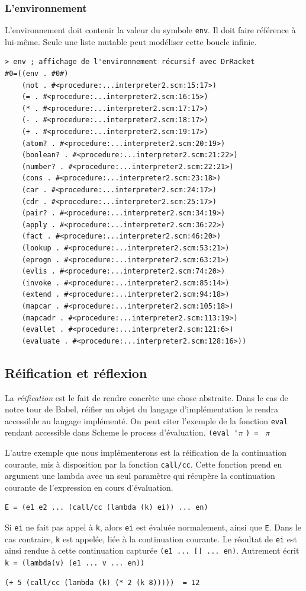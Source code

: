 \documentclass[11pt]{book}
\begin{document}
\subsubsection{L'environnement}
L'environnement doit contenir la valeur du symbole \verb+env+. Il doit faire référence à lui-même.
Seule une liste mutable peut modéliser cette boucle infinie. 
\begin{Verbatim}
> env ; affichage de l'environnement récursif avec DrRacket
#0=((env . #0#)
    (not . #<procedure:...interpreter2.scm:15:17>)
    (= . #<procedure:...interpreter2.scm:16:15>)
    (* . #<procedure:...interpreter2.scm:17:17>)
    (- . #<procedure:...interpreter2.scm:18:17>)
    (+ . #<procedure:...interpreter2.scm:19:17>)
    (atom? . #<procedure:...interpreter2.scm:20:19>)
    (boolean? . #<procedure:...interpreter2.scm:21:22>)
    (number? . #<procedure:...interpreter2.scm:22:21>)
    (cons . #<procedure:...interpreter2.scm:23:18>)
    (car . #<procedure:...interpreter2.scm:24:17>)
    (cdr . #<procedure:...interpreter2.scm:25:17>)
    (pair? . #<procedure:...interpreter2.scm:34:19>)
    (apply . #<procedure:...interpreter2.scm:36:22>)
    (fact . #<procedure:...interpreter2.scm:46:20>)
    (lookup . #<procedure:...interpreter2.scm:53:21>)
    (eprogn . #<procedure:...interpreter2.scm:63:21>)
    (evlis . #<procedure:...interpreter2.scm:74:20>)
    (invoke . #<procedure:...interpreter2.scm:85:14>)
    (extend . #<procedure:...interpreter2.scm:94:18>)
    (mapcar . #<procedure:...interpreter2.scm:105:18>)
    (mapcadr . #<procedure:...interpreter2.scm:113:19>)
    (evallet . #<procedure:...interpreter2.scm:121:6>)
    (evaluate . #<procedure:...interpreter2.scm:128:16>))
\end{Verbatim}

\subsection{Réification et réflexion}
La \textit{réification} est le fait de rendre concrète une chose abstraite.
Dans le cas de notre tour de Babel, réifier un objet du langage d'implémentation le rendra accessible au langage implémenté.
On peut citer l'exemple de la fonction \verb+eval+ rendant accessible dans Scheme le process d'évaluation. 
\verb+(eval '+$\pi$ \verb+) = + $\pi$

L'autre exemple que nous implémenterons est la réification de la continuation courante, mis à disposition
par la fonction \verb+call/cc+. Cette fonction prend en argument une lambda avec un seul paramètre qui récupère la
continuation courante de l'expression en cours d'évaluation.
\begin{Verbatim}
E = (e1 e2 ... (call/cc (lambda (k) ei)) ... en)	
\end{Verbatim}
  Si \verb+ei+ ne fait pas appel à \verb+k+, alors \verb+ei+ est évaluée normalement, ainsi que \verb+E+. 
Dans le cas contraire, \verb+k+ est appelée, liée à la continuation courante. Le résultat de \verb+ei+ est ainsi rendue
à cette continuation capturée \verb+(e1 ... [] ... en)+. Autrement écrit \verb+k = (lambda(v) (e1 ... v ... en))+
\begin{Verbatim}
(+ 5 (call/cc (lambda (k) (* 2 (k 8)))))  = 12
\end{Verbatim} 
\end{document}
